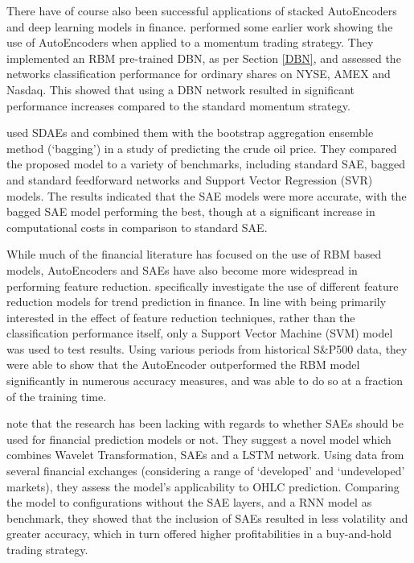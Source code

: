 \documentclass[a4paper,11pt,oneside]{article}
\theoremstyle{plain}
\theoremstyle{definition}
\begin{document}
	There have of course also been successful applications of stacked AutoEncoders and deep learning models in 
	finance. \citet{Takeuchi} performed some earlier work showing the use of AutoEncoders when applied to a 
	momentum trading strategy. They implemented an RBM pre-trained DBN, as per Section \ref{DBN}, and assessed the 
	networks classification performance for ordinary shares on NYSE, AMEX and Nasdaq. This showed that using a 
	DBN network resulted in significant performance increases compared to the standard momentum strategy.
	\hfill \break 
	
	\citet{Zhao} used SDAEs and combined them with the bootstrap aggregation ensemble method (`bagging') in a 
	study of predicting the crude oil price. They compared the proposed model to a variety of benchmarks, including 
	standard SAE, bagged and standard feedforward networks and Support Vector Regression (SVR) models. The results indicated that the SAE models 
	were more accurate, with the bagged SAE model performing the best, though at a significant increase in 
	computational costs in comparison to standard SAE.
	\hfill \break 
	
	While much of the financial literature has focused on the use of RBM based models, AutoEncoders and SAEs have 
	also become more widespread in performing feature reduction. \citet{Troiano} specifically investigate the use of 
	different feature reduction models for trend prediction in finance. In line with being primarily 
	interested in the effect of feature reduction techniques, rather than the classification performance itself, only a Support 
	Vector Machine (SVM) model was used to test results. Using various periods from historical S\&P500 data, they were able to show 
	that the AutoEncoder outperformed the RBM model significantly in numerous accuracy measures, and was able to do so at a 
	fraction of the training time.
	\hfill \break 
	
	\citet{Bao} note that the research has been lacking with regards to whether SAEs should be used for 
	financial prediction models or not. They suggest a novel model which combines Wavelet Transformation, SAEs 
	and a LSTM network. Using data from several financial exchanges (considering a 
	range of ‘developed’ and ‘undeveloped’ markets), they assess the model's applicability to OHLC prediction. 
	Comparing the model to configurations without the SAE layers, and a RNN model as benchmark, they showed 
	that the inclusion of SAEs resulted in less volatility and greater accuracy, which in turn offered higher profitabilities 
	in a buy-and-hold trading strategy.
	\hfill \break 
	
\end{document}
